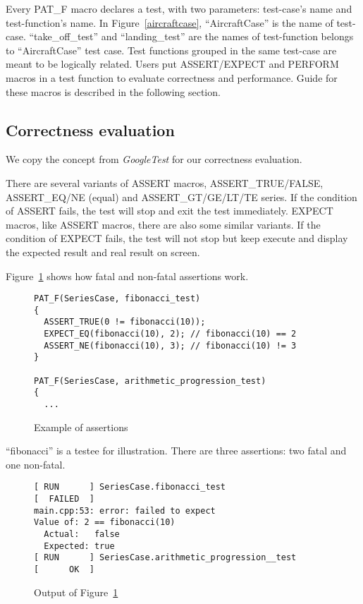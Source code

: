 \documentclass[final]{ols}
\begin{document}
Every PAT\_F macro declares a test, with two parameters: test-case's name and test-function's name.
In Figure~\ref{aircraftcase}, ``AircraftCase'' is the name of test-case.
``take\_off\_test'' and ``landing\_test'' are the names of test-function belongs to ``AircraftCase'' test case.
Test functions grouped in the same test-case are meant to be logically related.
Users put ASSERT/EXPECT and PERFORM macros in a test function to evaluate correctness and performance.
Guide for these macros is described in the following section.

\subsection{Correctness evaluation}
We copy the concept from \textit{GoogleTest} for our correctness evaluation.

There are several variants of ASSERT macros, ASSERT\_TRUE/FALSE, ASSERT\_EQ/NE (equal) and ASSERT\_GT/GE/LT/TE series.
If the condition of ASSERT fails, the test will stop and exit the test immediately.
EXPECT macros, like ASSERT macros, there are also some similar variants.
If the condition of EXPECT fails, the test will not stop but keep execute and display the expected result and real result on screen.

Figure~\ref{assert_example} shows how fatal and non-fatal assertions work.

\begin{figure}[h]
\lstset{language=C++}
\begin{lstlisting}[frame=single]
PAT_F(SeriesCase, fibonacci_test)
{
  ASSERT_TRUE(0 != fibonacci(10));
  EXPECT_EQ(fibonacci(10), 2); // fibonacci(10) == 2
  ASSERT_NE(fibonacci(10), 3); // fibonacci(10) != 3
}

PAT_F(SeriesCase, arithmetic_progression_test)
{
  ...
\end{lstlisting}
\caption{Example of assertions}
\label{assert_example}
\end{figure}

``fibonacci'' is a testee for illustration.
There are three assertions: two fatal and one non-fatal.

\begin{figure}[h]
\lstset{language=sh}
\begin{lstlisting}[frame=single]
[ RUN      ] SeriesCase.fibonacci_test
[  FAILED  ]
main.cpp:53: error: failed to expect
Value of: 2 == fibonacci(10)
  Actual:   false
  Expected: true
[ RUN      ] SeriesCase.arithmetic_progression__test
[      OK  ]
\end{lstlisting}
\caption{Output of Figure~\ref{assert_example}}
\label{assert_example_output}
\end{figure}
\end{document}

